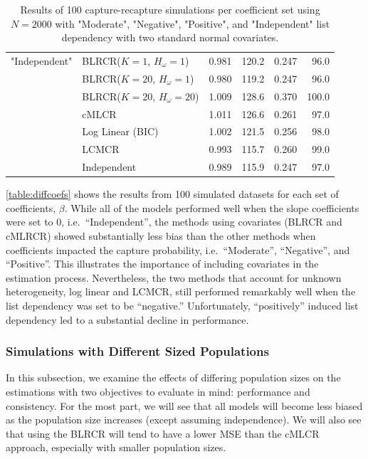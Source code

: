 \documentclass[
  12pt,
]{article}
\begin{document}
\begin{table}[H]
\begin{tabular}{||r l r r r r||}
 \hline
 "Independent" & BLRCR($K=1$, $H_\omega=1$)  & 0.981   & 120.2   & 0.247   & 96.0 \\ 
               & BLRCR($K=20$, $H_\omega=1$)    & 0.980     & 119.2     & 0.247     & 96.0 \\ 
               & BLRCR($K=20$, $H_\omega=20$)    & 1.009     & 128.6     & 0.370     & 100.0 \\                
               & cMLCR       & 1.011       & 126.6      & 0.261      & 97.0 \\
               & Log Linear (BIC)  & 1.002      & 121.5     & 0.256     & 98.0 \\ 
               & LCMCR       & 0.993       & 115.7      & 0.260      & 99.0 \\ 
               & Independent & 0.989 & 115.9& 0.247& 97.0 \\ 
 \hline
\end{tabular}
\caption{Results of 100 capture-recapture simulations per coefficient set using $N=2000$ with "Moderate", "Negative", "Positive", and "Independent" list dependency with two standard normal covariates. }
\label{table:diffcoefs}
\end{table}
\doublespacing

\autoref{table:diffcoefs} shows the results from 100 simulated datasets
for each set of coefficients, \(\beta\). While all of the models
performed well when the slope coefficients were set to 0,
i.e.~``Independent'', the methods using covariates (BLRCR and cMLRCR)
showed substantially less bias than the other methods when coefficients
impacted the capture probability, i.e.~``Moderate'', ``Negative'', and
``Positive''. This illustrates the importance of including covariates in
the estimation process. Nevertheless, the two methods that account for
unknown heterogeneity, log linear and LCMCR, still performed remarkably
well when the list dependency was set to be ``negative.'' Unfortunately,
``positively'' induced list dependency led to a substantial decline in
performance.

\subsubsection{Simulations with Different Sized Populations}
\label{Sec:simspopsize}

In this subsection, we examine the effects of differing population sizes
on the estimations with two objectives to evaluate in mind: performance
and consistency. For the most part, we will see that all models will
become less biased as the population size increases (except assuming
independence). We will also see that using the BLRCR will tend to have a
lower MSE than the cMLCR approach, especially with smaller population
sizes.
\end{document}
